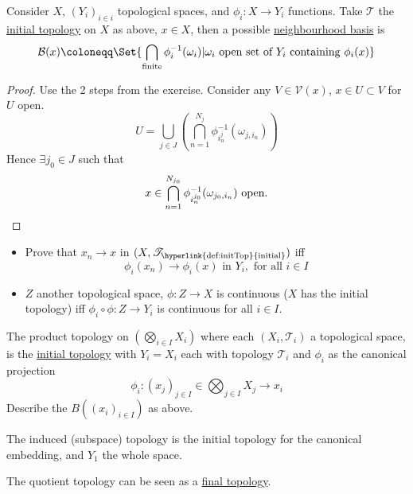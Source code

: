 \documentclass[twoside]{article}
\begin{document}
\begin{prop}
    Consider $X$, $(Y_i)_{i \in i}$ topological spaces, and $\phi_i:X \to Y_i$ functions.
    Take $\mathscr{T}$ the \hyperlink{def:initTop}{initial topology} on $X$ as above, $x \in X$, then a possible \hyperlink{def:neighbourhood}{neighbourhood basis} is
    \begin{equation*}
        \mathcal{B}(x) \coloneqq \Set{\bigcap_{\text{finite}} \phi_i^{-1}(\omega_i) | \omega_i \text{ open set of } Y_i \text{ containing }\phi_i(x)}
    \end{equation*}
\end{prop}
\begin{proof}
    Use the 2 steps from the exercise. Consider any $V \in \mathcal{V}(x)$, $x \in U \subset V$ for $U$ open.
    \begin{equation*}
        U = \bigcup_{j \in J} \left(\bigcap_{n =1}^{N_j} \phi_{i_n^j}^{-1} (\omega_{j, i_n})\right)
    \end{equation*}
    Hence $\exists j_0 \in J$ such that
    \begin{equation*}
        x \in \bigcap_{n=1}^{N_{j_0}} \phi_{i_n^{j_0}}^{-1} (\omega_{j_0, i_n}) \text{ open}. \qedhere
    \end{equation*}
\end{proof}
\begin{ex}\leavevmode
    \begin{itemize}
        \item Prove that $x_n \to x$ in $(X, \mathscr{T}_{\text{\hyperlink{def:initTop}{initial}}})$ iff
            \begin{equation*}
                \phi_i(x_n) \to \phi_i(x) \text{ in } Y_i, \text{ for all } i \in I
            \end{equation*}
        \item $Z$ another topological space, $\phi: Z \to X$ is continuous ($X$ has the initial topology) iff $\phi_i \circ \phi: Z \to Y_i$ is continuous for all $i \in I$.
    \end{itemize}
\end{ex}
\begin{remark}
    The product topology on $(\bigotimes_{i \in I} X_i)$ where each $(X_i, \mathscr{T}_i)$ a topological space, is the \hyperlink{def:initTop}{initial topology} with $Y_i = X_i$ each with topology $\mathcal{T}_i$ and $\phi_i$ as the canonical projection
    \begin{equation*}
        \phi_i: (x_j)_{j \in I} \in \bigotimes_{j \in I} X_j \to x_i
    \end{equation*}
    Describe the $B((x_i)_{i \in I})$ as above.

    The induced (subspace) topology is the initial topology for the canonical embedding, and $Y_1$ the whole space.

    The quotient topology can be seen as a \hyperlink{def:finalTop}{final topology}.
\end{remark}
\end{document}
